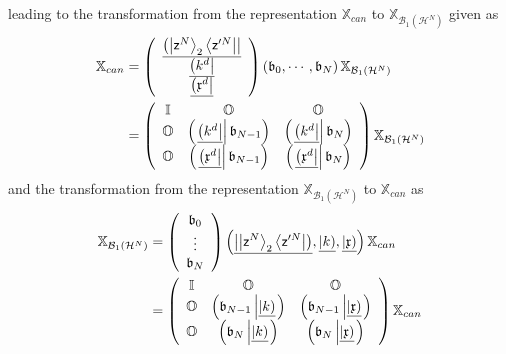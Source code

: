 \documentclass[aps,preprint]{revtex4}%
\begin{document}
leading to the transformation from the representation $\mathbb{X}_{can}$ to
$\mathbb{X}_{\mathcal{B}_{1}\left(  \mathcal{H}^{N}\right)  }$ given as
\begin{align}
\mathbb{X}_{can}  &  =\left(
\begin{array}
[c]{c}%
\underline{\left(  \left\vert \mathsf{z}^{N}\right\rangle _{2}\left\langle
\mathsf{z}^{\prime N}\right\vert \right\vert }\\
\underline{\left(  k^{d}\right\vert }\\
\underline{\left(  \mathfrak{x}^{d}\right\vert }%
\end{array}
\right)  \left(  \mathfrak{b}_{0},\cdots,\mathfrak{b}_{N}\right)
\mathbb{X}_{\mathcal{B}_{1}\left(  \mathcal{H}^{N}\right)  }\nonumber\\
&  =\left(
\begin{array}
[c]{ccc}%
\mathbb{I} & \mathbb{O} & \mathbb{O}\\
\mathbb{O} & \left(  \left.  \underline{\left(  k^{d}\right\vert }\right\vert
\mathfrak{b}_{N-1}\right)  & \left(  \left.  \underline{\left(  k^{d}%
\right\vert }\right\vert \mathfrak{b}_{N}\right) \\
\mathbb{O} & \left(  \left.  \underline{\left(  \mathfrak{x}^{d}\right\vert
}\right\vert \mathfrak{b}_{N-1}\right)  & \left(  \left.  \underline{\left(
\mathfrak{x}^{d}\right\vert }\right\vert \mathfrak{b}_{N}\right)
\end{array}
\right)  \mathbb{X}_{\mathcal{B}_{1}\left(  \mathcal{H}^{N}\right)  }%
\end{align}
and the transformation from the representation $\mathbb{X}_{\mathcal{B}%
_{1}\left(  \mathcal{H}^{N}\right)  }$ to $\mathbb{X}_{can}$ as
\begin{align}
\mathbb{X}_{\mathcal{B}_{1}\left(  \mathcal{H}^{N}\right)  }  &  =\left(
\begin{array}
[c]{c}%
\mathfrak{b}_{0}\\
\vdots\\
\mathfrak{b}_{N}%
\end{array}
\right)  \left(  \underline{\left\vert \left\vert \mathsf{z}^{N}\right\rangle
_{2}\left\langle \mathsf{z}^{\prime N}\right\vert \right)  },\underline
{\left\vert k\right)  },\underline{\left\vert \mathfrak{x}\right)  }\right)
\mathbb{X}_{can}\nonumber\\
&  =\left(
\begin{array}
[c]{ccc}%
\mathbb{I} & \mathbb{O} & \mathbb{O}\\
\mathbb{O} & \left(  \mathfrak{b}_{N-1}\left\vert \underline{\left\vert
k\right)  }\right.  \right)  & \left(  \mathfrak{b}_{N-1}\left\vert
\underline{\left\vert \mathfrak{x}\right)  }\right.  \right) \\
\mathbb{O} & \left(  \mathfrak{b}_{N}\left\vert \underline{\left\vert
k\right)  }\right.  \right)  & \left(  \mathfrak{b}_{N}\left\vert
\underline{\left\vert \mathfrak{x}\right)  }\right.  \right)
\end{array}
\right)  \mathbb{X}_{can}%
\end{align}
\end{document}
